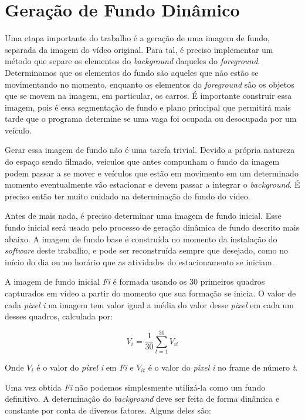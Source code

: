 \section{Geração de Fundo Dinâmico} \label{geracaoFundo}

     Uma etapa importante do trabalho é a geração de uma imagem de fundo, separada da imagem do vídeo original. Para tal, é preciso implementar um método que separe os elementos do \textit{background} daqueles do \textit{foreground}. Determinamos que os elementos do fundo são aqueles que não estão se movimentando no momento, enquanto os elementos do \textit{foreground} são os objetos que se movem na imagem, em particular, os carros. É importante construir essa imagem, pois é essa segmentação de fundo e plano principal que permitirá mais tarde que o programa determine se uma vaga foi ocupada ou desocupada por um veículo.

     Gerar essa imagem de fundo não é uma tarefa trivial. Devido a própria natureza do espaço sendo filmado, veículos que antes compunham o fundo da imagem podem passar a se mover e veículos que estão em movimento em um determinado momento eventualmente vão estacionar e devem passar a integrar o \textit{background}. É preciso então ter muito cuidado na determinação do fundo do vídeo.

     Antes de mais nada, é preciso determinar uma imagem de fundo inicial. Esse fundo inicial será usado pelo processo de geração dinâmica de fundo descrito mais abaixo. A imagem de fundo base é construída no momento da instalação do \textit{software} deste trabalho, e pode ser reconstruída sempre que desejado, como no início do dia ou no horário que as atividades do estacionamento se iniciam.

     A imagem de fundo inicial \textit{Fi} é formada usando os 30 primeiros quadros capturados em vídeo a partir do momento que sua formação se inicia. O valor de cada \textit{pixel} \textit{i} na imagem tem valor igual a média do valor desse \textit{pixel} em cada um desses quadros, calculada por:

     \begin{equation}\label{mediaFundoInicial}
       V_{i} = \frac{1}{30}\sum_{t=1}^{30}V_{it}
     \end{equation}

     Onde $V_{i}$ é o valor do \textit{pixel} \textit{i} em \textit{Fi} e $V_{it}$ é o valor do \textit{pixel} \textit{i} no frame de número \textit{t}.

     Uma vez obtida \textit{Fi} não podemos simplesmente utilizá-la como um fundo definitivo. A determinação do \textit{background} deve ser feita de forma dinâmica e constante por conta de diversos fatores. Alguns deles são:

